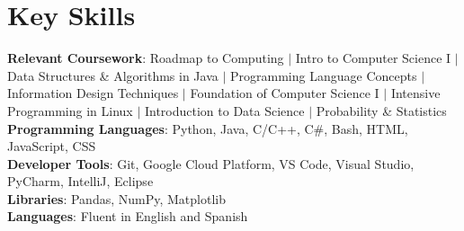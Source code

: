\documentclass[letterpaper,11pt]{article}
\begin{document}
\section{Key Skills}
 \begin{itemize}[leftmargin=0.15in, label={}]
    \small{\item{
     \textbf{Relevant Coursework}{: Roadmap to Computing $|$  Intro to Computer Science I $|$ Data Structures \& Algorithms in Java $|$ Programming Language Concepts $|$ Information Design Techniques $|$ Foundation of Computer Science I $|$ Intensive Programming in Linux $|$ Introduction to Data Science $|$ Probability \& Statistics} \\
     \textbf{Programming Languages}{: Python, Java, C/C++, C\#, Bash, HTML, JavaScript, CSS} \\
     \textbf{Developer Tools}{: Git, Google Cloud Platform, VS Code, Visual Studio, PyCharm, IntelliJ, Eclipse} \\
     \textbf{Libraries}{: Pandas, NumPy, Matplotlib}\\
     \textbf{Languages}{: Fluent in English and Spanish} \\
    }}
 \end{itemize}


\end{document}
